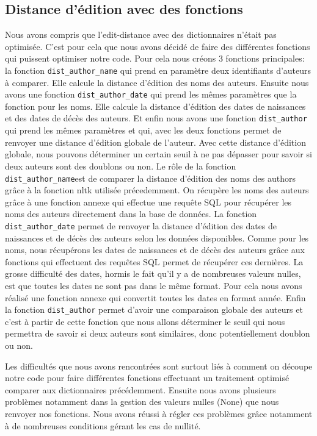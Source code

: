 \documentclass[12pt, a4paper]{article}
\begin{document}
\subsection{Distance d'édition avec des fonctions}
Nous avons compris que l'edit-distance avec des dictionnaires n'était pas optimisée. C'est pour cela que nous avons décidé de faire des différentes fonctions qui puissent optimiser notre code. Pour cela nous créons 3 fonctions principales: la fonction \verb?dist_author_name? qui prend en paramètre deux identifiants d'auteurs à comparer. Elle calcule la distance d'édition des noms des auteurs. Ensuite nous avons une fonction \verb?dist_author_date? qui prend les mêmes paramètres que la fonction pour les noms. Elle calcule la distance d'édition des dates de naissances et des dates de décès des auteurs. Et enfin nous avons une fonction \verb?dist_author? qui prend les mêmes paramètres et qui, avec les deux fonctions permet de renvoyer une distance d'édition globale de l'auteur. Avec cette distance d'édition globale, nous pouvons déterminer un certain seuil à ne pas dépasser pour savoir si deux auteurs sont des doublons ou non. Le rôle de la fonction \verb?dist_author_name?est de comparer la distance d'édition des noms des authors grâce à la fonction nltk utilisée précedemment. On récupère les noms des auteurs grâce à une fonction annexe qui effectue une requête SQL pour récupérer les noms des auteurs directement dans la base de données. La fonction \verb?dist_author_date? permet de renvoyer la distance d'édition des dates de naissances et de décès des auteurs selon les données disponibles. Comme pour les noms, nous récupérons les dates de naissances et de décès des auteurs grâce aux fonctions qui effectuent des requêtes SQL permet de récupérer ces dernières. La grosse difficulté des dates, hormis le fait qu'il y a de nombreuses valeurs nulles, est que toutes les dates ne sont pas dans le même format. Pour cela nous avons réalisé une fonction annexe qui convertit toutes les dates en format année. Enfin la fonction \verb?dist_author? permet d'avoir une comparaison globale des auteurs et c'est à partir de cette fonction que nous allons déterminer le seuil qui nous permettra de savoir si deux auteurs sont similaires, donc potentiellement doublon ou non.

Les difficultés que nous avons rencontrées sont surtout liés à comment on découpe notre code pour faire différentes fonctions effectuant un traitement optimisé comparer aux dictionnaires précédemment. Ensuite nous avons plusieurs problèmes notamment dans la gestion des valeurs nulles (None) que nous renvoyer nos fonctions. Nous avons réussi à régler ces problèmes grâce notamment à de nombreuses conditions gérant les cas de nullité.
\end{document}
